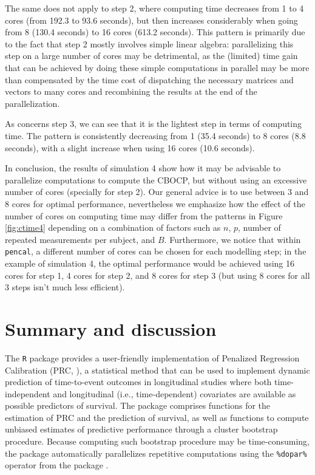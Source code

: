 The same does not apply to step 2, where computing time decreases from 1
to 4 cores (from 192.3 to 93.6 seconds), but then increases considerably
when going from 8 (130.4 seconds) to 16 cores (613.2 seconds). This
pattern is primarily due to the fact that step 2 mostly involves simple
linear algebra: parallelizing this step on a large number of cores may
be detrimental, as the (limited) time gain that can be achieved by doing
these simple computations in parallel may be more than compensated by
the time cost of dispatching the necessary matrices and vectors to many
cores and recombining the results at the end of the parallelization.

As concerns step 3, we can see that it is the lightest step in terms of
computing time. The pattern is consistently decreasing from 1 (35.4
seconds) to 8 cores (8.8 seconds), with a slight increase when using 16
cores (10.6 seconds).

In conclusion, the results of simulation 4 show how it may be advisable
to parallelize computations to compute the CBOCP, but without using an
excessive number of cores (specially for step 2). Our general advice is
to use between 3 and 8 cores for optimal performance, nevertheless we
emphasize how the effect of the number of cores on computing time may
differ from the patterns in Figure \ref{fig:ctime4} depending on a
combination of factors such as \(n\), \(p\), number of repeated
measurements per subject, and \(B\). Furthermore, we notice that within
\texttt{pencal}, a different number of cores can be chosen for each
modelling step; in the example of simulation 4, the optimal performance
would be achieved using 16 cores for step 1, 4 cores for step 2, and 8
cores for step 3 (but using 8 cores for all 3 steps isn't much less
efficient).

\section{Summary and discussion}\label{summary-and-discussion}

The \texttt{R} package  provides a user-friendly
implementation of Penalized Regression Calibration (PRC,
\citet{signorelli2021}), a statistical method that can be used to
implement dynamic prediction of time-to-event outcomes in longitudinal
studies where both time-independent and longitudinal (i.e.,
time-dependent) covariates are available as possible predictors of
survival. The package comprises functions for the estimation of PRC and
the prediction of survival, as well as functions to compute unbiased
estimates of predictive performance through a cluster bootstrap
procedure. Because computing such bootstrap procedure may be
time-consuming, the package automatically parallelizes repetitive
computations using the \texttt{\%dopar\%} operator from the
 package \citep{foreach2022}.


